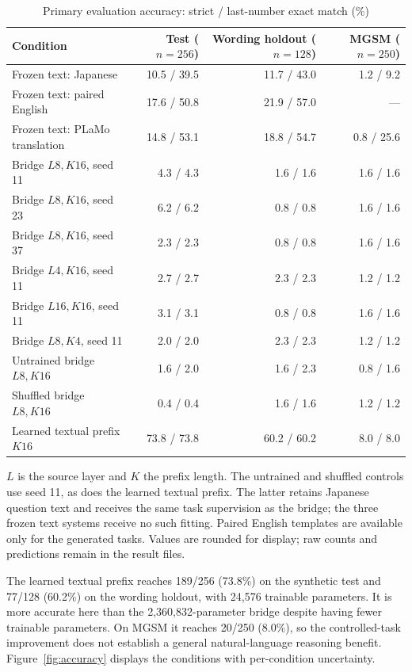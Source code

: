 \begin{table}[htbp]
\caption{Primary evaluation accuracy: strict / last-number exact match (\%)}
\label{tab:accuracy}
\centering\small\sffamily
\begin{tabular}{@{}lrrr@{}}
\toprule
Condition & Test ($n=256$) & Wording holdout ($n=128$) & MGSM ($n=250$) \\
\midrule
Frozen text: Japanese & 10.5 / 39.5 & 11.7 / 43.0 & 1.2 / 9.2 \\
Frozen text: paired English & 17.6 / 50.8 & 21.9 / 57.0 & --- \\
Frozen text: PLaMo translation & 14.8 / 53.1 & 18.8 / 54.7 & 0.8 / 25.6 \\
Bridge $L8,K16$, seed 11 & 4.3 / 4.3 & 1.6 / 1.6 & 1.6 / 1.6 \\
Bridge $L8,K16$, seed 23 & 6.2 / 6.2 & 0.8 / 0.8 & 1.6 / 1.6 \\
Bridge $L8,K16$, seed 37 & 2.3 / 2.3 & 0.8 / 0.8 & 1.6 / 1.6 \\
Bridge $L4,K16$, seed 11 & 2.7 / 2.7 & 2.3 / 2.3 & 1.2 / 1.2 \\
Bridge $L16,K16$, seed 11 & 3.1 / 3.1 & 0.8 / 0.8 & 1.6 / 1.6 \\
Bridge $L8,K4$, seed 11 & 2.0 / 2.0 & 2.3 / 2.3 & 1.2 / 1.2 \\
Untrained bridge $L8,K16$ & 1.6 / 2.0 & 1.6 / 2.3 & 0.8 / 1.6 \\
Shuffled bridge $L8,K16$ & 0.4 / 0.4 & 1.6 / 1.6 & 1.2 / 1.2 \\
Learned textual prefix $K16$ & 73.8 / 73.8 & 60.2 / 60.2 & 8.0 / 8.0 \\
\bottomrule
\end{tabular}
\par\smallskip\footnotesize
$L$ is the source layer and $K$ the prefix length. The untrained and shuffled
controls use seed 11, as does the learned textual prefix. The latter retains
Japanese question text and receives the same task supervision as the bridge;
the three frozen text systems receive no such fitting. Paired English templates
are available only for the generated tasks. Values are rounded for display;
raw counts and predictions remain in the result files.
\end{table}

The learned textual prefix reaches 189/256 (73.8\%) on the synthetic test and
77/128 (60.2\%) on the wording holdout, with 24,576 trainable parameters.
It is more accurate here than the 2,360,832-parameter bridge despite having fewer
trainable parameters.
On MGSM it reaches 20/250 (8.0\%), so the controlled-task improvement does not
establish a general natural-language reasoning benefit.
Figure~\ref{fig:accuracy} displays the conditions with per-condition uncertainty.

